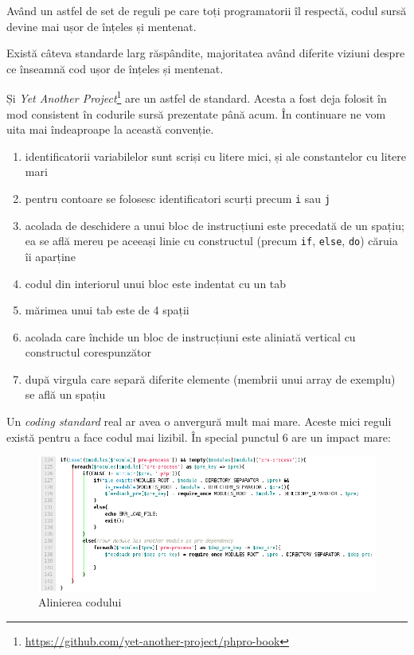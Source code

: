 Având un astfel de set de reguli pe care toți programatorii îl respectă, codul
sursă devine mai ușor de înțeles și mentenat.

Există câteva standarde larg răspândite, majoritatea având diferite viziuni
despre ce înseamnă {\glqq}cod ușor de înțeles și mentenat{\grqq}.

Și \textit{Yet Another Project}\footnote{\url{https://github.com/yet-another-project/phpro-book}}
are un astfel de standard. Acesta a fost deja folosit în mod consistent în codurile
sursă prezentate până acum. În continuare ne vom uita mai îndeaproape la această
convenție.

\begin{enumerate}
\item identificatorii variabilelor sunt scriși cu litere mici, și ale constantelor cu litere mari
\item pentru contoare se folosesc identificatori scurți precum \texttt{i} sau \texttt{j}
\item acolada de deschidere a unui bloc de instrucțiuni este precedată de un spațiu;
ea se află mereu pe aceeași linie cu constructul (precum \texttt{if}, \texttt{else}, \texttt{do}) căruia îi aparține
\item codul din interiorul unui bloc este indentat cu un tab
\item mărimea unui tab este de 4 spații
\item acolada care închide un bloc de instrucțiuni este aliniată vertical cu constructul corespunzător
\item după virgula care separă diferite elemente (membrii unui array de exemplu) se află un spațiu
\end{enumerate}

Un \textit{coding standard} real ar avea o anvergură mult mai mare. Aceste mici reguli există pentru
a face codul mai lizibil. În special punctul 6 are un impact mare:

\begin{figure}[ht!]
  \centering
    \includegraphics[scale=.5]{cap02/code_align.png}
  \caption{Alinierea codului}
  \label{fig:code_align}
\end{figure}

